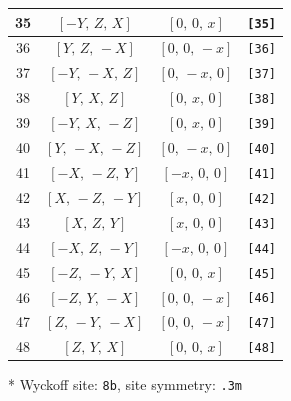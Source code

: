\documentclass[fleqn,8pt]{jsarticle}
\begin{document}
\begin{longtable}{cccc}
35 & $\left[ - Y,\, Z,\, X \right]$ & $\left[ 0,\, 0,\, x \right]$ & {\tt [35]} \\ \hline
36 & $\left[ Y,\, Z,\, - X \right]$ & $\left[ 0,\, 0,\, - x \right]$ & {\tt [36]} \\ \hline
37 & $\left[ - Y,\, - X,\, Z \right]$ & $\left[ 0,\, - x,\, 0 \right]$ & {\tt [37]} \\ \hline
38 & $\left[ Y,\, X,\, Z \right]$ & $\left[ 0,\, x,\, 0 \right]$ & {\tt [38]} \\ \hline
39 & $\left[ - Y,\, X,\, - Z \right]$ & $\left[ 0,\, x,\, 0 \right]$ & {\tt [39]} \\ \hline
40 & $\left[ Y,\, - X,\, - Z \right]$ & $\left[ 0,\, - x,\, 0 \right]$ & {\tt [40]} \\ \hline
41 & $\left[ - X,\, - Z,\, Y \right]$ & $\left[ - x,\, 0,\, 0 \right]$ & {\tt [41]} \\ \hline
42 & $\left[ X,\, - Z,\, - Y \right]$ & $\left[ x,\, 0,\, 0 \right]$ & {\tt [42]} \\ \hline
43 & $\left[ X,\, Z,\, Y \right]$ & $\left[ x,\, 0,\, 0 \right]$ & {\tt [43]} \\ \hline
44 & $\left[ - X,\, Z,\, - Y \right]$ & $\left[ - x,\, 0,\, 0 \right]$ & {\tt [44]} \\ \hline
45 & $\left[ - Z,\, - Y,\, X \right]$ & $\left[ 0,\, 0,\, x \right]$ & {\tt [45]} \\ \hline
46 & $\left[ - Z,\, Y,\, - X \right]$ & $\left[ 0,\, 0,\, - x \right]$ & {\tt [46]} \\ \hline
47 & $\left[ Z,\, - Y,\, - X \right]$ & $\left[ 0,\, 0,\, - x \right]$ & {\tt [47]} \\ \hline
48 & $\left[ Z,\, Y,\, X \right]$ & $\left[ 0,\, 0,\, x \right]$ & {\tt [48]} \\
\end{longtable}
* Wyckoff site: {\tt 8b}, site symmetry: {\tt .3m}
\renewcommand{\arraystretch}{1.2}
\end{document}
